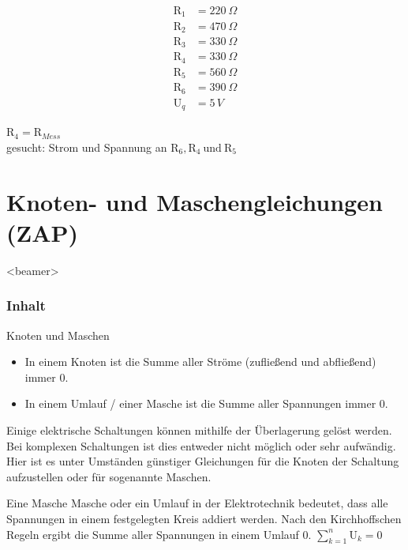 \documentclass[aspectratio=169, ignorenonframetext]{beamer}
\begin{document}
  \begin{align*}
    \text{R}_{1} &= 220\ \Omega \\
    \text{R}_{2} &= 470\ \Omega \\
    \text{R}_{3} &= 330\ \Omega \\
    \text{R}_{4} &= 330\ \Omega \\
    \text{R}_{5} &= 560\ \Omega \\
    \text{R}_{6} &= 390\ \Omega \\
    \text{U}_q &= 5\,V
  \end{align*}

  $\text{R}_4 = \text{R}_{Mess}$ \\gesucht: Strom und Spannung an $\text{R}_6, \text{R}_4\  \text{und} \ \text{R}_5$\\


\section[Gleichungen]{Knoten- und Maschengleichungen (ZAP)}
\begin{frame}<beamer>
  \frametitle{Inhalt}
\end{frame}

\begin{frame}{Knoten und Maschen}
  \begin{itemize}
   \item In einem Knoten ist die Summe aller Ströme (zufließend und abfließend) immer 0.
   \item In einem Umlauf / einer Masche ist die Summe aller Spannungen immer 0.
  \end{itemize}
\end{frame}

Einige elektrische Schaltungen können mithilfe der Überlagerung gelöst werden. Bei komplexen Schaltungen ist dies entweder nicht möglich oder sehr aufwändig. Hier ist es unter Umständen günstiger Gleichungen für die Knoten der Schaltung aufzustellen oder für sogenannte Maschen.

Eine Masche Masche oder ein Umlauf in der Elektrotechnik bedeutet, dass alle Spannungen in einem festgelegten Kreis addiert werden. Nach den Kirchhoffschen Regeln ergibt die Summe aller Spannungen in einem Umlauf 0. $\sum_{k=1}^n \text{U}_k = 0$
\end{document}
